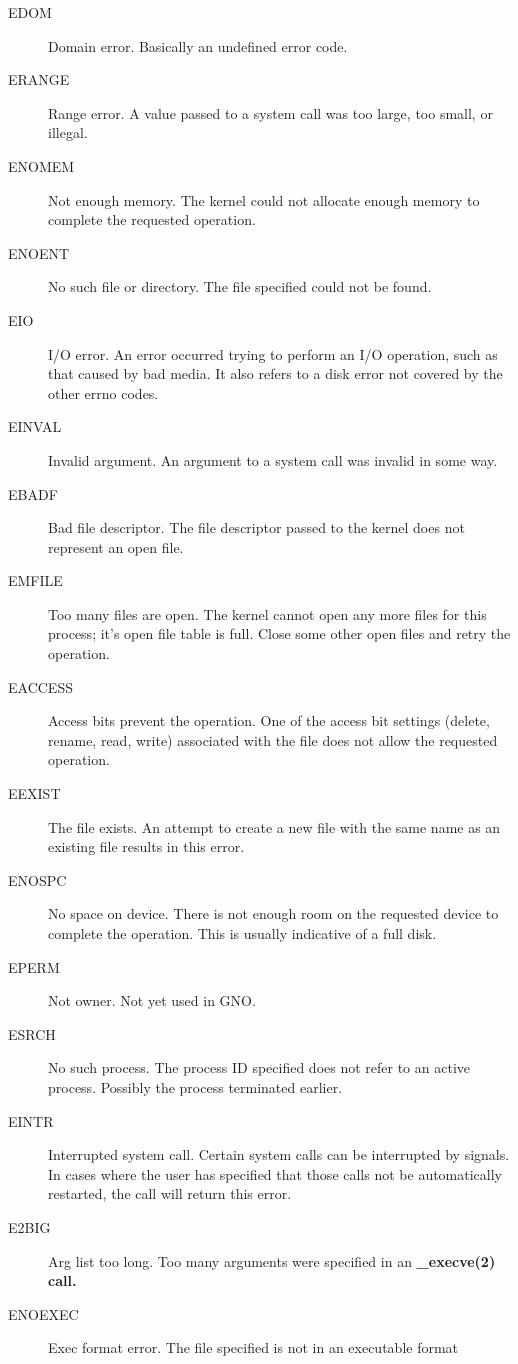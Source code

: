\documentclass{report}
\begin{document}
\begin{description}
\item[EDOM]
	Domain error. Basically an undefined error code.
\item[ERANGE]
	Range error. A value passed to a system call was too large,
	too small, or illegal. 
\item[ENOMEM]
	Not enough memory. The kernel could not allocate enough
	memory to complete the requested operation.
\item[ENOENT]
	No such file or directory. The file specified could not be found.
\item[EIO]
	I/O error. An error occurred trying to perform an I/O operation,
	such as that caused by bad media.  It also refers to a disk
	error not covered by the other errno codes.
\item[EINVAL]
	Invalid argument. An argument to a system call was invalid in some way.
\item[EBADF]
	Bad file descriptor. The file descriptor passed to the kernel does not
	represent an open file.
\item[EMFILE]
	Too many files are open.  The kernel cannot open any more files
	for this process; it's open file table is full. Close some other
	open files and retry the operation.
\item[EACCESS]
	Access bits prevent the operation. One of the access bit settings
	(delete, rename, read, write) associated with the file does not allow
	the requested operation.
\item[EEXIST]
	The file exists. An attempt to create a new file with the same name
	as an existing file results in this error.
\item[ENOSPC]
	No space on device. There is not enough room on the requested
	device to complete the operation.  This is usually indicative
	of a full disk. 
\item[EPERM]
	Not owner. Not yet used in GNO.
\item[ESRCH]
	No such process. The process ID specified does not refer to an active
	process. Possibly the process terminated earlier.
\item[EINTR]
	Interrupted system call.  Certain system calls can be interrupted by
	signals. In cases where the user has specified that those calls not be
	automatically restarted, the call will return this error.
\item[E2BIG]
	Arg list too long. Too many arguments were specified in an 
	\bf \_{}execve\rm(2) call.
\item[ENOEXEC]
	Exec format error. The file specified is not in an executable format

\end{description}
\end{document}
